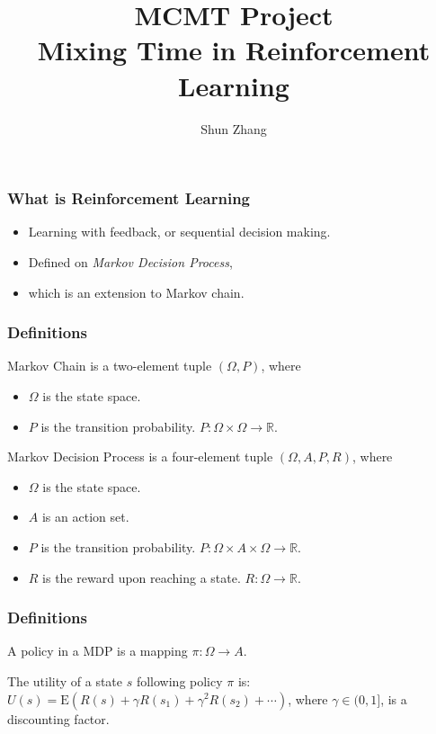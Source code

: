 \documentclass{beamer}
\title{MCMT Project\\Mixing Time in Reinforcement Learning}
\author{Shun Zhang}
\newcommand{\R}{\mathbb{R}}
\newcommand{\E}{\mathrm{E}}
\begin{document}
\begin{frame}
\titlepage
\end{frame}

\begin{frame}
\frametitle{What is Reinforcement Learning}
\begin{itemize}
\item Learning with feedback, or sequential decision making.
\item Defined on {\em Markov Decision Process},
\item which is an extension to Markov chain.
\end{itemize}
\end{frame}

\begin{frame}
\frametitle{Definitions}
\begin{definition}
Markov Chain is a two-element tuple $(\Omega, P)$, where
\begin{itemize}
\item $\Omega$ is the state space.
\item $P$ is the transition probability. $P: \Omega \times \Omega \rightarrow
\R$.
\end{itemize}
\end{definition}

\begin{definition}
Markov Decision Process is a four-element tuple $(\Omega, A, P, R)$, where
\begin{itemize}
\item $\Omega$ is the state space.
\item $A$ is an action set.
\item $P$ is the transition probability. $P: \Omega \times A \times \Omega
\rightarrow \R$.
\item $R$ is the reward upon reaching a state. $R: \Omega \rightarrow \R$.
\cite{rl}
\end{itemize}
\end{definition}
\end{frame}

\begin{frame}
\frametitle{Definitions}
\begin{definition}
A policy in a MDP is a mapping $\pi: \Omega \rightarrow A$.
\end{definition}

\begin{definition}
The utility of a state $s$ following policy $\pi$ is: $U(s) = \E (R(s) + \gamma
R(s_1) + \gamma^2 R(s_2) + \cdots)$, where $\gamma \in (0, 1]$, is a discounting
factor.
\end{definition}
\end{frame}
\end{document}
